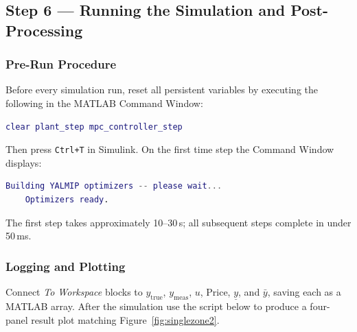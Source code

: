 \subsection{Step 6 — Running the Simulation and Post-Processing}
\label{subsec:running}

\subsubsection{Pre-Run Procedure}

Before every simulation run, reset all persistent variables by
executing the following in the MATLAB Command Window:

\begin{lstlisting}[language=Matlab]
	clear plant_step mpc_controller_step
\end{lstlisting}

Then press \texttt{Ctrl+T} in Simulink.  On the first time step the
Command Window displays:

\begin{lstlisting}[language=Matlab]
	Building YALMIP optimizers -- please wait...
	Optimizers ready.
\end{lstlisting}

The first step takes approximately 10--30\,s; all subsequent steps
complete in under 50\,ms.

\subsubsection{Logging and Plotting}

Connect \textit{To Workspace} blocks to $y_\mathrm{true}$,
$y_\mathrm{meas}$, $u$, Price, $\underline{y}$, and $\bar{y}$, saving
each as a MATLAB array.  After the simulation use the script below to
produce a four-panel result plot matching Figure~\ref{fig:singlezone2}.

